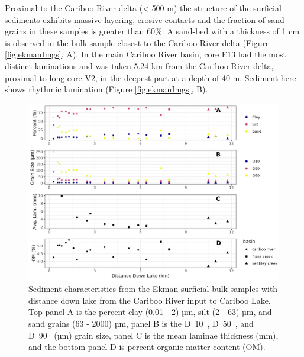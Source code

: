 \documentclass[Royal,times,doublespace,sageh]{sagej}
\begin{document}
Proximal to the Cariboo River delta (\textless{} 500 m) the structure of
the surficial sediments exhibits massive layering, erosive contacts and
the fraction of sand grains in these samples is greater than 60\%. A
sand-bed with a thickness of 1 cm is observed in the bulk sample closest
to the Cariboo River delta (Figure \ref{fig:ekmanImgs}, A). In the main
Cariboo River basin, core E13 had the most distinct laminations and was
taken 5.24 km from the Cariboo River delta, proximal to long core V2, in
the deepest part at a depth of 40 m. Sediment here shows rhythmic
lamination (Figure \ref{fig:ekmanImgs}, B).

\begin{figure}

{\centering \includegraphics[width=1\linewidth]{figs/ekman_seds} 

}

\caption{Sediment characteristics from the Ekman surficial bulk samples with distance down lake from the Cariboo River input to Cariboo Lake. Top panel A is the percent clay (0.01 - 2) µm, silt (2 - 63) µm, and sand grains (63 - 2000) µm, panel B is the  D~10~, D~50~, and D~90~ (µm) grain size, panel C is the mean laminae thickness (mm), and the bottom panel D is percent organic matter content (OM).}\label{fig:ekmanSeds}
\end{figure}
\end{document}
